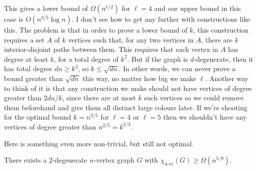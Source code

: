 \documentclass{patmorin}
\newcommand{\rn}[1]{\chi_{\operatorname{#1-vr}}}
\begin{document}
This gives a lower bound of $\Omega(n^{1/2})$ for $\ell=4$ and our upper bound in this case is $O(n^{3/5}\log n)$.  I don't see how to get any further with constructions like this. The problem is that in order to prove a lower bound of $k$, this construction requires a set $A$ of $k$ vertices such that, for any two vertices in $A$, there are $k$ interior-disjoint paths between them.  This requires that each vertex in $A$ has degree at least $k$, for a total degree of $k^2$.  But if the graph is $d$-degenerate, then it has total degree $dn \ge k^2$, so $k\le \sqrt{dn}$.  In other words, we can never prove a bound greater than $\sqrt{dn}$ this way, no matter how big we make $\ell$.  Another way to think of it is that any construction we make should not have vertices of degree greater than $2dn/k$, since there are at most $k$ such vertices so we could remove them beforehand and give them all distinct large colours later.  If we're shooting for the optimal bound $k=n^{3/5}$ for $\ell=4$ or $\ell=5$ then we shouldn't have any vertices of degree greater than $n^{2/5}=k^{2/3}$.

Here is something even more non-trivial, but still not optimal.

\begin{thm}
  There exists a $2$-degenerate $n$-vertex graph $G$ with $\rn{4}(G)\ge \Omega(n^{5/9})$.
\end{thm}
\end{document}
